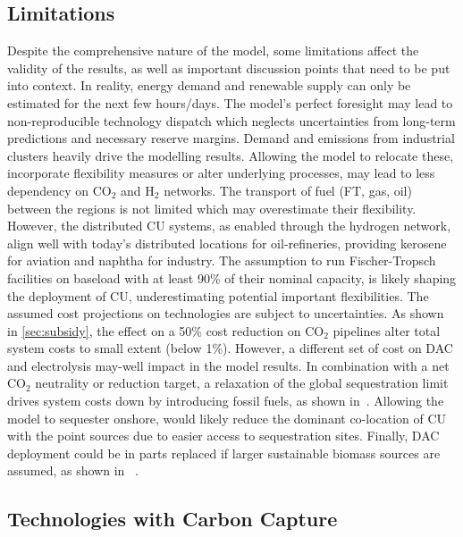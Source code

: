 \documentclass[twocolumn]{article}
\newcommand{\carbon}{CO$_2$}
\newcommand{\hydrogen}{H$_2$}
\begin{document}
\subsection{Limitations}
\label{sec:limitations}
Despite the comprehensive nature of the model, some limitations affect the validity of the results, as well as important discussion points that need to be put into context.
In reality, energy demand and renewable supply can only be estimated for the next few hours/days. The model's perfect foresight may lead to non-reproducible technology dispatch which neglects uncertainties from long-term predictions and necessary reserve margins.
Demand and emissions from industrial clusters heavily drive the modelling results. Allowing the model to relocate these, incorporate flexibility measures or alter underlying processes, may lead to less dependency on \carbon{} and \hydrogen{} networks.
The transport of fuel (FT, gas, oil) between the regions is not limited which may overestimate their flexibility. However, the distributed CU systems, as enabled through the hydrogen network, align well with today's distributed locations for oil-refineries, providing kerosene for aviation and naphtha for industry. The assumption to run Fischer-Tropsch facilities on baseload with at least 90\% of their nominal capacity, is likely shaping the deployment of CU, underestimating potential important flexibilities.
The assumed cost projections on technologies are subject to uncertainties. As shown in \ref{sec:subsidy}, the effect on a 50\% cost reduction on \carbon{} pipelines alter total system costs to small extent (below 1\%). However, a different set of cost on DAC and electrolysis may-well impact in the model results.
In combination with a net \carbon{} neutrality or reduction target, a relaxation of the global sequestration limit drives system costs down by introducing fossil fuels, as shown in~\cite{hofmannDesigningCO2Network2023}. Allowing the model to sequester onshore, would likely reduce the dominant co-location of CU with the point sources due to easier access to sequestration sites.
Finally, DAC deployment could be in parts replaced if larger sustainable biomass sources are assumed, as shown in ~\cite{lauerCrucialRoleBioenergy2023}.

\subsection{Technologies with Carbon Capture}
\end{document}
